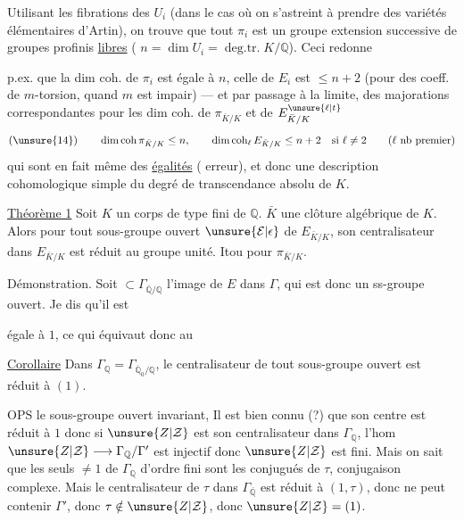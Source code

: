 Utilisant les fibrations des $U_i$ (dans le cas où on s'astreint à prendre des variétés élémentaires d'Artin), on trouve que tout $\pi_i$ est un groupe  extension successive de  groupes profinis \uline{libres} ( $n=\dim U_i=\operatorname{deg.tr.}K/\mathbb Q$). Ceci redonne

p.ex. que la dim coh. de $\pi_i$ est égale à $n$, celle de $E_i$ est $\leq n+2$ (pour des coeff.  de $m$-torsion, quand $m$ est impair) --- et par passage à la limite, des majorations correspondantes pour les dim coh. de $\pi_{\bar K/K}$ et de $E_{\bar K/K}^{\unsure{\ell|t}}$
\[
(\unsure{14})\qquad \dim\operatorname{coh}\pi_{\bar K/K}\leq n,\qquad
\dim\operatorname{coh}_{\ell}E_{\bar K/K}\leq n+2\quad\text{si }\ell\neq2
\qquad(\ell\text{ nb premier})
\]
qui sont en fait même des \uline{égalités} ( erreur), et  donc une description cohomologique simple du degré de transcendance absolu de $K$.

\uline{Théorème 1} Soit $K$ un corps  de type fini de $\mathbb Q$.  $\bar K$ une clôture algébrique de $K$. Alors pour tout sous-groupe ouvert $\unsure{\mathcal E|\epsilon}$ de $E_{\bar K/K}$, son centralisateur dans $E_{\bar K/K}$ est réduit au groupe unité. Itou pour $\pi_{\bar K/K}$.

Démonstration. Soit $\subset\Gamma_{\overline{\mathbb Q}/\mathbb Q}$ l'image de $E$ dans $\Gamma$, qui est donc un ss-groupe ouvert.   Je dis qu'il est

égale à $1$, ce qui équivaut donc au

\uline{Corollaire} Dans $\Gamma_{\mathbb Q}=\Gamma_{\overline{\mathbb Q}_0/\mathbb Q}$, le centralisateur de tout sous-groupe ouvert est réduit à $(1)$.

OPS le sous-groupe ouvert  invariant, Il est bien connu (?) que son centre est réduit à $1$
donc si $\unsure{Z|\mathcal Z}$ est son centralisateur dans $\Gamma_{\mathbb Q}$, l'hom $\unsure{Z|\mathcal Z}\longrightarrow\Gamma_{\mathbb Q}/\Gamma'$ est injectif donc $\unsure{Z|\mathcal Z}$ est fini. Mais on sait que les seuls  $\neq1$ de $\Gamma_{\mathbb Q}$ d'ordre fini sont les conjugués de $\tau$, conjugaison complexe. Mais le centralisateur de $\tau$ dans $\Gamma_{\overline{\mathbb Q}}$ est réduit à $(1,\tau)$, donc ne peut contenir $\Gamma'$, donc $\tau\notin\unsure{Z|\mathcal Z}$, donc $\unsure{Z|\mathcal Z}=(1)$.

